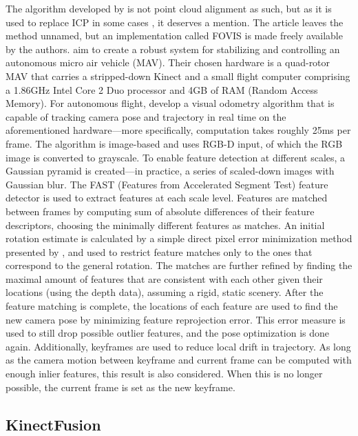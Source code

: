The algorithm developed by \citet{huang2011visual} is not point cloud alignment as such, but as it is used to replace ICP in some cases \citep{Whelan12rssw}, it deserves a mention. The article leaves the method unnamed, but an implementation called FOVIS \citep{fovis} is made freely available by the authors. \citet{huang2011visual} aim to create a robust system for stabilizing and controlling an autonomous micro air vehicle (MAV). Their chosen hardware is a quad-rotor MAV that carries a stripped-down Kinect and a small flight computer comprising a 1.86GHz Intel Core 2 Duo processor and 4GB of RAM (Random Access Memory). For autonomous flight, \citeauthor{huang2011visual} develop a visual odometry algorithm that is capable of tracking camera pose and trajectory in real time on the aforementioned hardware---more specifically, computation takes roughly 25ms per frame. The algorithm is image-based and uses RGB-D input, of which the RGB image is converted to grayscale. To enable feature detection at different scales, a Gaussian pyramid is created---in practice, a series of scaled-down images with Gaussian blur. The FAST (Features from Accelerated Segment Test) feature detector \citep{rosten2006machine} is used to extract features at each scale level. Features are matched between frames by computing sum of absolute differences of their feature descriptors, choosing the minimally different features as matches. An initial rotation estimate is calculated by a simple direct pixel error minimization method presented by \citet{mei2009}, and used to restrict feature matches only to the ones that correspond to the general rotation. The matches are further refined by finding the maximal amount of features that are consistent with each other given their locations (using the depth data), assuming a rigid, static scenery. After the feature matching is complete, the locations of each feature are used to find the new camera pose by minimizing feature reprojection error. This error measure is used to still drop possible outlier features, and the pose optimization is done again. Additionally, keyframes are used to reduce local drift in trajectory. As long as the camera motion between keyframe and current frame can be computed with enough inlier features, this result is also considered. When this is no longer possible, the current frame is set as the new keyframe. \citep{huang2011visual}

\subsection{KinectFusion}

